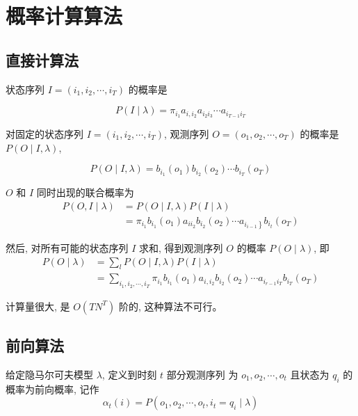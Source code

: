 \section{概率计算算法}

\subsection{直接计算法}

状态序列 $ I=\left(i_{1}, i_{2}, \cdots, i_{T}\right) $ 的概率是

$$ P(I \mid \lambda)=\pi_{i_{1}} a_{i, i_{2}} a_{i_{2} i_{3}} \cdots a_{i_{T-1} i_{T}} $$


对固定的状态序列 $ I=\left(i_{1}, i_{2}, \cdots, i_{T}\right) $, 观测序列 $ O=\left(o_{1}, o_{2}, \cdots, o_{T}\right) $ 的概率是 $ P(O \mid I, \lambda) $,

$$ P(O \mid I, \lambda)=b_{i_{1}}\left(o_{1}\right) b_{i_{2}}\left(o_{2}\right) \cdots b_{i_{T}}\left(o_{T}\right) $$

$ O $ 和 $ I $ 同时出现的联合概率为
$$ 
\begin{aligned}
    P(O, I \mid \lambda)&=P(O \mid I, \lambda) P(I \mid \lambda)\\
    &=\pi_{i_{1}} b_{i_{1}}\left(o_{1}\right) a_{i i_{2}} b_{i_{2}}\left(o_{2}\right) \cdots a_{\left.i_{i-1}\right\}} b_{i_{t}}\left(o_{T}\right)
\end{aligned}
$$

然后, 对所有可能的状态序列 $ I $ 求和, 得到观测序列 $ O $ 的概率 $ P(O \mid \lambda) $, 即
$$ 
\begin{aligned}
    P(O \mid \lambda)
&=\sum_{l} P(O \mid I, \lambda) P(I \mid \lambda) \\
&= \sum_{i_{1}, i_{2}, \cdots, i_{T}} \pi_{i_{1}} b_{i_{1}}\left(o_{1}\right) a_{i, i_{2}} b_{i_{2}}\left(o_{2}\right) \cdots a_{i_{r-1} i_{T}} b_{i_{T}}\left(o_{T}\right) 
\end{aligned}
 $$

\begin{remark}
    计算量很大, 是 $ O\left(T N^{T}\right) $ 阶的, 这种算法不可行。
\end{remark}

\subsection{前向算法}

\begin{definition}[前向概率]
    给定隐马尔可夫模型 $ \lambda $, 定义到时刻 $ t $ 部分观测序列 为 $ o_{1}, o_{2}, \cdots, o_{t} $ 且状态为 $ q_{i} $ 的概率为前向概率, 记作
$$
\alpha_{t}(i)=P\left(o_{1}, o_{2}, \cdots, o_{t}, i_{t}=q_{i} \mid \lambda\right)
$$
\end{definition}

